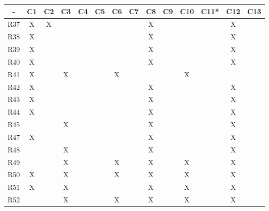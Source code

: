 \begin{table}[H]
\centering
\begin{tabular}{|c|c|c|c|c|c|c|c|c|c|c|c|c|c|} 
\hline
\rowcolor[rgb]{0.71,0.102,0} -     & C1 & C2 & C3 & C4 & C5 & C6 & C7 & C8 & C9 & C10 & C11* & C12 & C13  \\ 
\hline
{\cellcolor[rgb]{0.71,0.102,0}}R37 & X  & X  &    &    &    &    &    & X  &    &     &      & X   &      \\ 
\hline
{\cellcolor[rgb]{0.71,0.102,0}}R38 & X  &    &    &    &    &    &    & X  &    &     &      & X   &      \\ 
\hline
{\cellcolor[rgb]{0.71,0.102,0}}R39 & X  &    &    &    &    &    &    & X  &    &     &      & X   &      \\ 
\hline
{\cellcolor[rgb]{0.71,0.102,0}}R40 & X  &    &    &    &    &    &    & X  &    &     &      & X   &      \\ 
\hline
{\cellcolor[rgb]{0.71,0.102,0}}R41 & X  &    & X  &    &    & X  &    &    &    & X   &      &     &      \\ 
\hline
{\cellcolor[rgb]{0.71,0.102,0}}R42 & X  &    &    &    &    &    &    & X  &    &     &      & X   &      \\ 
\hline
{\cellcolor[rgb]{0.71,0.102,0}}R43 & X  &    &    &    &    &    &    & X  &    &     &      & X   &      \\ 
\hline
{\cellcolor[rgb]{0.71,0.102,0}}R44 & X  &    &    &    &    &    &    & X  &    &     &      & X   &      \\ 
\hline
{\cellcolor[rgb]{0.71,0.102,0}}R45 &    &    & X  &    &    &    &    & X  &    &     &      & X   &      \\ 
\hline
{\cellcolor[rgb]{0.71,0.102,0}}R47 & X  &    &    &    &    &    &    & X  &    &     &      & X   &      \\ 
\hline
{\cellcolor[rgb]{0.71,0.102,0}}R48 &    &    & X  &    &    &    &    & X  &    &     &      & X   &      \\ 
\hline
{\cellcolor[rgb]{0.71,0.102,0}}R49 &    &    & X  &    &    & X  &    & X  &    & X   &      & X   &      \\ 
\hline
{\cellcolor[rgb]{0.71,0.102,0}}R50 & X  &    & X  &    &    & X  &    & X  &    & X   &      & X   &      \\ 
\hline
{\cellcolor[rgb]{0.71,0.102,0}}R51 & X  &    & X  &    &    &    &    & X  &    & X   &      & X   &      \\ 
\hline
{\cellcolor[rgb]{0.71,0.102,0}}R52 &    &    & X  &    &    & X  &    & X  &    & X   &      & X   &      \\ 

\end{tabular}
\end{table}
